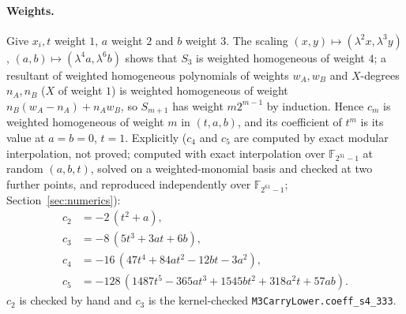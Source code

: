 \documentclass[11pt]{article}
\newcommand{\F}{\mathbb F}
\newcommand{\code}[1]{\texttt{#1}}
\theoremstyle{definition}
\theoremstyle{remark}
\begin{document}
\paragraph{Weights.} Give $x_i,t$ weight $1$, $a$ weight $2$ and $b$ weight $3$.
The scaling $(x,y)\mapsto(\lambda^2x,\lambda^3y)$, $(a,b)\mapsto(\lambda^4a,\lambda^6b)$
shows that $S_3$ is weighted homogeneous of weight $4$; a resultant of
weighted homogeneous polynomials of weights $w_A,w_B$ and $X$-degrees
$n_A,n_B$ ($X$ of weight $1$) is weighted homogeneous of weight
$n_B(w_A-n_A)+n_Aw_B$, so $S_{m+1}$ has weight $m2^{m-1}$ by induction.
Hence $c_m$ is weighted homogeneous of weight $m$ in $(t,a,b)$, and its
coefficient of $t^m$ is its value at $a=b=0$, $t=1$. Explicitly ($c_4$ and
$c_5$ are computed by exact modular interpolation, not proved; computed
with exact interpolation over $\F_{2^{31}-1}$ at random $(a,b,t)$, solved on a weighted-monomial basis and
checked at two further points, and reproduced independently over
$\F_{2^{61}-1}$; Section~\ref{sec:numerics}):
\begin{align*}
 c_2&=-2\,(t^2+a),\\
 c_3&=-8\,(5t^3+3at+6b),\\
 c_4&=-16\,(47t^4+84at^2-12bt-3a^2),\\
 c_5&=-128\,(1487t^5-365at^3+1545bt^2+318a^2t+57ab).
\end{align*}
$c_2$ is checked by hand and $c_3$ is the kernel-checked
\code{M3CarryLower.coeff\_s4\_333}.
\end{document}
